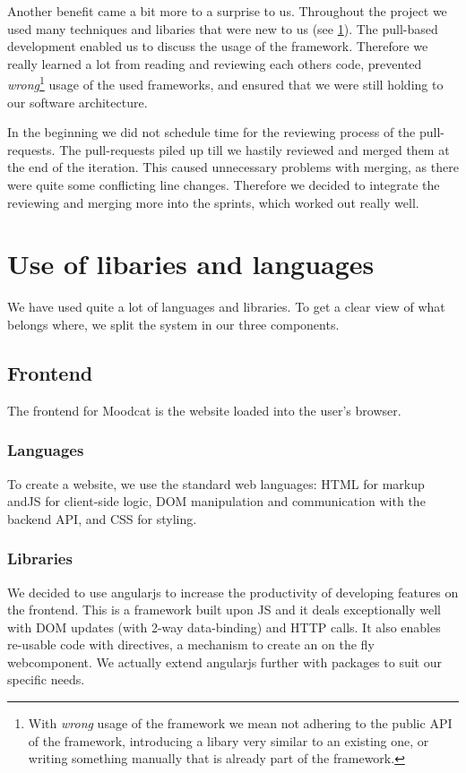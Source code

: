 \par
Another benefit came a bit more to a surprise to us.
Throughout the project we used many techniques and libaries that were new to us (see \ref{reflection-libaries}).
The pull-based development enabled us to discuss the usage of the framework.
Therefore we really learned a lot from reading and reviewing each others code,  prevented \textit{wrong}\footnote{With \textit{wrong} usage of the framework we mean not adhering to the public API of the framework, introducing a libary very similar to an existing one, or writing something manually that is already part of the framework.} usage of the used frameworks, and ensured that we were still holding to our software architecture.

\par
In the beginning we did not schedule time for the reviewing process of the pull-requests.
The pull-requests piled up till we hastily reviewed and merged them at the end of the iteration.
This caused unnecessary problems with merging, as there were quite some conflicting line changes.
Therefore we decided to integrate the reviewing and merging more into the sprints, which worked out really well.

\section{Use of libaries and languages}
\label{reflection-libaries}
We have used quite a lot of languages and libraries.
To get a clear view of what belongs where, we split the system in our three components.

\subsection{Frontend}
The frontend for Moodcat is the website loaded into the user's browser.

\subsubsection{Languages}
To create a website, we use the standard web languages: \gls{HTML} for markup and\gls{JS} for client-side logic, DOM manipulation and communication with the backend API, and \gls{CSS} for styling.

\subsubsection{Libraries}
We decided to use \gls{angularjs} to increase the productivity of developing features on the frontend.
This is a framework built upon \gls{JS} and it deals exceptionally well with DOM updates (with 2-way \gls{data-binding}) and \gls{HTTP} calls.
It also enables re-usable code with directives, a mechanism to create an on the fly webcomponent.
We actually extend \gls{angularjs} further with packages to suit our specific needs.

